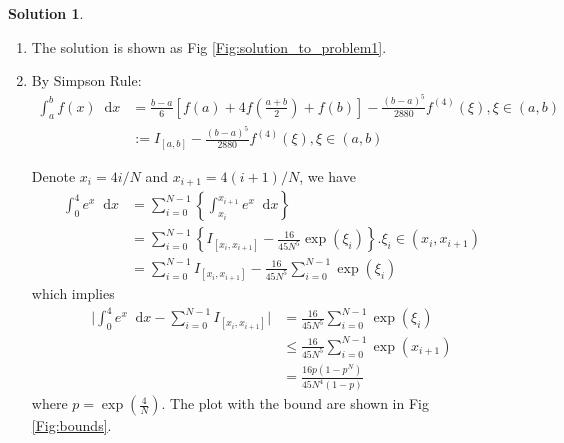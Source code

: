 \documentclass{article}
\newcommand*\diff{\mathop{}\!\mathrm{d}}
\theoremstyle{definition}
\newtheorem{solution}{Solution}
\begin{document}
\begin{solution}
	\begin{enumerate}
		\item The solution is shown as Fig \ref{Fig:solution_to_problem1}.
		\item By Simpson Rule:
		\begin{align*}
		\int_{a}^{b}f(x)\diff x&=\frac{b-a}{6}\left[f(a)+4f\left(\frac{a+b}{2}\right)+f(b)\right]-\frac{(b-a)^5}{2880}f^{(4)}(\xi),\xi\in(a,b)\\
		&:=I_{[a,b]}-\frac{(b-a)^5}{2880}f^{(4)}(\xi),\xi\in(a,b)
		\end{align*}
		
		Denote $x_i=4i/N$ and $x_{i+1}=4(i+1)/N$,  we have
		\begin{align*}
		\int_{0}^{4}e^x\diff x&=\sum_{i=0}^{N-1}\left\{\int_{x_i}^{x_{i+1}}e^x\diff x\right\}\\
		&=\sum_{i=0}^{N-1}\left\{I_{[x_i,x_{i+1}]}-\frac{16}{45N^5}\exp(\xi_i)\right\}. \xi_i\in\left(x_i,x_{i+1}\right)\\
		&=\sum_{i=0}^{N-1}I_{[x_i,x_{i+1}]}-\frac{16}{45N^5}\sum_{i=0}^{N-1}\exp(\xi_i)
		\end{align*}
		which implies
		\begin{align*}
		\Big|\int_{0}^{4}e^x\diff x-\sum_{i=0}^{N-1}I_{[x_i,x_{i+1}]}\Big|&=\frac{16}{45N^5}\sum_{i=0}^{N-1}\exp(\xi_i)\\
		&\leq \frac{16}{45N^5}\sum_{i=0}^{N-1}\exp(x_{i+1})\\
		&=\frac{16p(1-p^N)}{45N^4(1-p)}
		\end{align*}
		where $p=\exp(\frac{4}{N})$. The plot with the bound are shown in Fig \ref{Fig:bounds}. 


\end{enumerate}
\end{solution}
\end{document}
